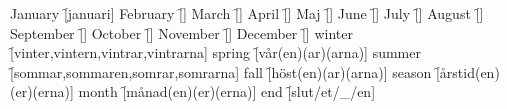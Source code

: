\begin{questions}
    \begin{multicols}{2}
        \raggedcolumns
        \question January \f[januari]
        \question February \f[]
        \question March \f[]
        \question April \f[]
        \question Maj \f[]
        \question June \f[]
        \question July \f[]
        \question August \f[]
        \question September \f[]
        \question October \f[]
        \question November \f[]
        \question December \f[]
        \question winter \f[vinter,vintern,vintrar,vintrarna]
        \question spring \f[vår(en)(ar)(arna)]
        \question summer \f[sommar,sommaren,somrar,somrarna]
        \question fall \f[höst(en)(ar)(arna)]
        \question season \f[årstid(en)(er)(erna)]
        \question month \f[månad(en)(er)(erna)]
        \question end \f[slut/et/\_/en]
    \end{multicols}
\end{questions}
